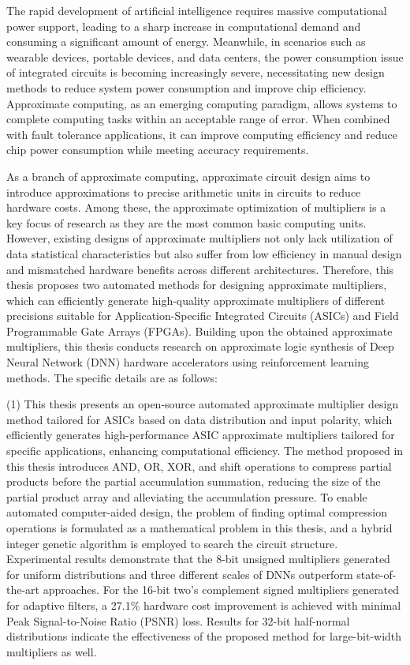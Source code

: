 \begin{abstract*}
    The rapid development of artificial intelligence requires massive computational power support, leading to a sharp increase in computational demand and consuming a significant amount of energy. Meanwhile, in scenarios such as wearable devices, portable devices, and data centers, the power consumption issue of integrated circuits is becoming increasingly severe, necessitating new design methods to reduce system power consumption and improve chip efficiency. Approximate computing, as an emerging computing paradigm, allows systems to complete computing tasks within an acceptable range of error. When combined with fault tolerance applications, it can improve computing efficiency and reduce chip power consumption while meeting accuracy requirements.
    
    As a branch of approximate computing, approximate circuit design aims to introduce approximations to precise arithmetic units in circuits to reduce hardware costs. Among these, the approximate optimization of multipliers is a key focus of research as they are the most common basic computing units. However, existing designs of approximate multipliers not only lack utilization of data statistical characteristics but also suffer from low efficiency in manual design and mismatched hardware benefits across different architectures. Therefore, this thesis proposes two automated methods for designing approximate multipliers, which can efficiently generate high-quality approximate multipliers of different precisions suitable for Application-Specific Integrated Circuits (ASICs) and Field Programmable Gate Arrays (FPGAs). Building upon the obtained approximate multipliers, this thesis conducts research on approximate logic synthesis of Deep Neural Network (DNN) hardware accelerators using reinforcement learning methods. The specific details are as follows:

    (1) This thesis presents an open-source automated approximate multiplier design method tailored for ASICs based on data distribution and input polarity, which efficiently generates high-performance ASIC approximate multipliers tailored for specific applications, enhancing computational efficiency. The method proposed in this thesis introduces AND, OR, XOR, and shift operations to compress partial products before the partial accumulation summation, reducing the size of the partial product array and alleviating the accumulation pressure. To enable automated computer-aided design, the problem of finding optimal compression operations is formulated as a mathematical problem in this thesis, and a hybrid integer genetic algorithm is employed to search the circuit structure. Experimental results demonstrate that the 8-bit unsigned multipliers generated for uniform distributions and three different scales of DNNs outperform state-of-the-art approaches. For the 16-bit two's complement signed multipliers generated for adaptive filters, a 27.1\% hardware cost improvement is achieved with minimal Peak Signal-to-Noise Ratio (PSNR) loss. Results for 32-bit half-normal distributions indicate the effectiveness of the proposed method for large-bit-width multipliers as well.


\end{abstract*}
